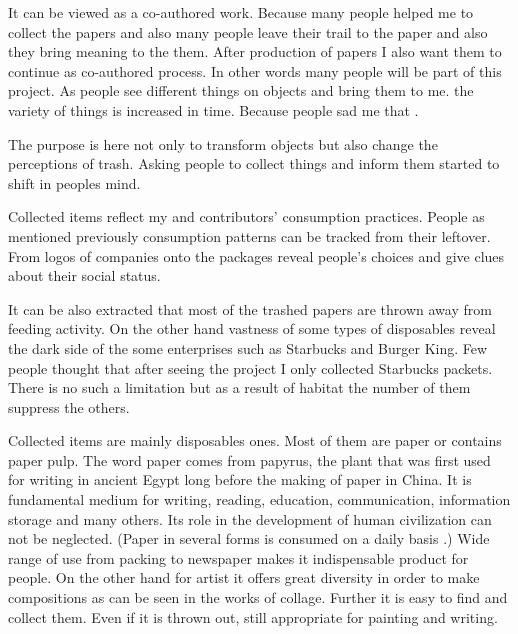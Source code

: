 It can be viewed as a co-authored work. Because many people helped me to collect the papers and also many people leave their trail to the paper and also they bring meaning to the them. After production of papers I also want them to continue as co-authored process. In other words many people will be part of this project. As people see different things on objects and bring them to me. the variety of things is increased in time. Because people sad me that . 




The purpose is here not only to transform objects but also change the perceptions of trash. Asking people to collect things and inform them started to shift in peoples mind.

Collected items reflect my and contributors' consumption practices. People as mentioned previously consumption patterns can be tracked from their leftover. From logos of companies onto the packages reveal people's choices and give clues about their social status.

It can be also extracted that most of the trashed papers are thrown away from feeding activity. On the other hand vastness of some types of disposables reveal the dark side of the some enterprises such as Starbucks and Burger King. Few people thought that after seeing the project I only collected Starbucks packets. There is no such a limitation but as a result of habitat the number of them suppress the others.

Collected items are mainly disposables ones. Most of them are paper or contains paper pulp. The word paper comes from papyrus, the plant that was first used for writing in ancient Egypt long before the making of paper in China. It is fundamental medium for writing, reading, education, communication, information storage and many others. Its role in the development of human civilization can not be neglected. (Paper in several forms is consumed on a daily basis \cite{trafford2012paper}.) Wide range of use from packing to newspaper makes it indispensable product for people. On the other hand for artist it offers great diversity in order to make compositions as can be seen in the works of collage. Further it is easy to find and collect them. Even if it is thrown out, still appropriate for painting and writing.

